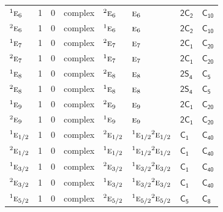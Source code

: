 \documentclass[10pt,a4paper]{article}
\makeatletter
\def\grouprule#1#2{\noalign{\marks\LTgroupmarks{\the\belowrulesep}\nobreak\vskip#1%
  \vskip\aboverulesep}\multispan\LT@cols\unskip{\leaders\hrule\@height#2\hfill\kern\z@}\cr
  \noalign{\penalty\LTrulebreak\vskip\belowrulesep\global\@lastruleclass\z@}}
\numberwithin{equation}{section}
\newcommand{\grp}[1]{\mathsf{#1}}
\newcommand{\irr}[1]{\text{\normalfont\scshape #1}}
\newcommand{\conjpair}[1]{{}^{#1}}
\makeatother
\begin{document}
{\begin{longtable}{@{}lrrlllll@{}}
$\conjpair{1}\irr{e}_{6}$ & 1 & $0$ & complex & $\conjpair{2}\irr{e}_{6}$ & $\irr{e}_{6}$ & \href{2C2.pdf}{$\grp{2C_{2}}$} & \href{../../../rotation/data/pdf/C10.pdf}{$\grp{C_{10}}$}\\
$\conjpair{2}\irr{e}_{6}$ & 1 & $0$ & complex & $\conjpair{1}\irr{e}_{6}$ & $\irr{e}_{6}$ & \href{2C2.pdf}{$\grp{2C_{2}}$} & \href{../../../rotation/data/pdf/C10.pdf}{$\grp{C_{10}}$}\\
$\conjpair{1}\irr{e}_{7}$ & 1 & $0$ & complex & $\conjpair{2}\irr{e}_{7}$ & $\irr{e}_{7}$ & \href{2C1.pdf}{$\grp{2C_{1}}$} & $\grp{C_{20}}$\\
$\conjpair{2}\irr{e}_{7}$ & 1 & $0$ & complex & $\conjpair{1}\irr{e}_{7}$ & $\irr{e}_{7}$ & \href{2C1.pdf}{$\grp{2C_{1}}$} & $\grp{C_{20}}$\\
$\conjpair{1}\irr{e}_{8}$ & 1 & $0$ & complex & $\conjpair{2}\irr{e}_{8}$ & $\irr{e}_{8}$ & \href{2S4.pdf}{$\grp{2S_{4}}$} & \href{../../../rotation/data/pdf/C5.pdf}{$\grp{C_{5}}$}\\
$\conjpair{2}\irr{e}_{8}$ & 1 & $0$ & complex & $\conjpair{1}\irr{e}_{8}$ & $\irr{e}_{8}$ & \href{2S4.pdf}{$\grp{2S_{4}}$} & \href{../../../rotation/data/pdf/C5.pdf}{$\grp{C_{5}}$}\\
$\conjpair{1}\irr{e}_{9}$ & 1 & $0$ & complex & $\conjpair{2}\irr{e}_{9}$ & $\irr{e}_{9}$ & \href{2C1.pdf}{$\grp{2C_{1}}$} & $\grp{C_{20}}$\\
$\conjpair{2}\irr{e}_{9}$ & 1 & $0$ & complex & $\conjpair{1}\irr{e}_{9}$ & $\irr{e}_{9}$ & \href{2C1.pdf}{$\grp{2C_{1}}$} & $\grp{C_{20}}$\\
\grouprule{0pt}{\lightrulewidth}
$\conjpair{1}\irr{e}_{1/2}$ & 1 & $0$ & complex & $\conjpair{2}\irr{e}_{1/2}$ & $\conjpair{1}\irr{e}_{1/2}\conjpair{2}\irr{e}_{1/2}$ & \href{C1.pdf}{$\grp{C_{1}}$} & $\grp{C_{40}}$\\
$\conjpair{2}\irr{e}_{1/2}$ & 1 & $0$ & complex & $\conjpair{1}\irr{e}_{1/2}$ & $\conjpair{1}\irr{e}_{1/2}\conjpair{2}\irr{e}_{1/2}$ & \href{C1.pdf}{$\grp{C_{1}}$} & $\grp{C_{40}}$\\
$\conjpair{1}\irr{e}_{3/2}$ & 1 & $0$ & complex & $\conjpair{2}\irr{e}_{3/2}$ & $\conjpair{1}\irr{e}_{3/2}\conjpair{2}\irr{e}_{3/2}$ & \href{C1.pdf}{$\grp{C_{1}}$} & $\grp{C_{40}}$\\
$\conjpair{2}\irr{e}_{3/2}$ & 1 & $0$ & complex & $\conjpair{1}\irr{e}_{3/2}$ & $\conjpair{1}\irr{e}_{3/2}\conjpair{2}\irr{e}_{3/2}$ & \href{C1.pdf}{$\grp{C_{1}}$} & $\grp{C_{40}}$\\
$\conjpair{1}\irr{e}_{5/2}$ & 1 & $0$ & complex & $\conjpair{2}\irr{e}_{5/2}$ & $\conjpair{1}\irr{e}_{5/2}\conjpair{2}\irr{e}_{5/2}$ & \href{C5.pdf}{$\grp{C_{5}}$} & \href{../../../rotation/data/pdf/C8.pdf}{$\grp{C_{8}}$}\\

\end{longtable}}
\end{document}
